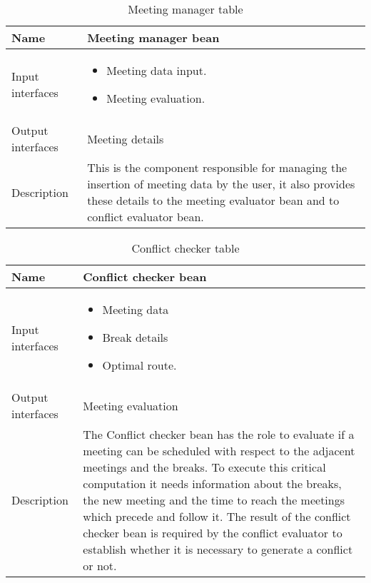 \begin{flushleft}

\begin{table}[htp]

\begin{tabular}{l|p{7cm}}

Name&\textbf{Meeting manager bean}\\
\hline
\hline
Input interfaces&
	\begin{itemize}
	\item Meeting data input.
	\item Meeting evaluation.
	\end{itemize}
\\
\hline
Output interfaces& Meeting details 
\\
\hline
Description&This is the component responsible for managing the insertion of meeting data by the user, it also provides these details to the meeting evaluator bean and to conflict evaluator bean.
\\
\hline


\end{tabular}

\caption{Meeting manager  table } 
\label{tab:meetingmanagertable}

\end{table}

\end{flushleft}

\begin{flushleft}
	
	\begin{table}[htp]
		
		\begin{tabular}{l|p{7cm}}
		
			Name&\textbf{Conflict checker bean}\\
			\hline
			\hline
			Input interfaces&
			\begin{itemize}
				\item Meeting data  \item Break details \item Optimal route.
			\end{itemize}
			\\
			\hline
			Output interfaces& Meeting evaluation\\
			\hline
			Description&The Conflict checker bean has the role to evaluate if a meeting can be scheduled with respect to the adjacent meetings and the breaks. To execute this critical computation it needs information about the breaks, the new meeting and the time to reach the meetings which precede and follow it. The result of the conflict checker bean is required by the conflict evaluator to establish whether it is necessary to generate a conflict or not. \\
			\hline
			
			
		\end{tabular}
		
		\caption{Conflict checker  table } 
		\label{tab:conflictcheckertable}
		
	\end{table}
	
\end{flushleft}

